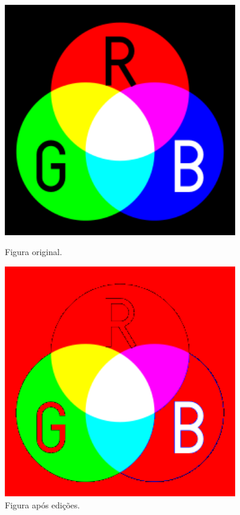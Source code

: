 \documentclass{bmvc2k}
\begin{document}
\begin{figure}[htb]
	\label{}
    \centering
    \begin{minipage}{0.45\textwidth}
        \centering
        \includegraphics[width=0.9\textwidth]{Figs/default_image.png}
        \caption{Figura original.}
        \label{fig:original}
    \end{minipage}\hfill
    \begin{minipage}{0.45\textwidth}
        \centering
        \includegraphics[width=0.9\textwidth]{Figs/vermelho.png}
        \caption{Figura após edições.}
        \label{fig:red_original}
    \end{minipage}
\end{figure}
\end{document}
